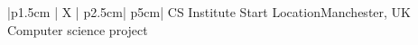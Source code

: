 %
\iftrue %
\begin{myTableEnv}{|p{1.5cm} | X | p{2.5cm}| p{5cm}|}%
    \myRow%
        {}{CS Institute}%
        {Start}{}%
    \myRow%
        {Location}{Manchester, UK}%
        {}{Computer science project}%
\end{myTableEnv}%
%
\fi%
%